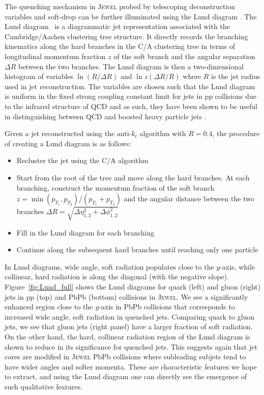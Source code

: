 \documentclass[notoc,preprintnumbers]{JHEP3}
\begin{document}
The quenching mechanism in \textsc{Jewel} probed by telescoping deconstruction variables and soft-drop can be further illuminated using the Lund diagram \cite{Andersson1989}. The Lund diagram~\cite{Andersson1989} is a diagrammatic jet representation associated with the Cambridge/Aachen clustering tree structure. It directly records the branching kinematics along the hard branches in the C/A clustering tree in terms of longitudinal momentum fraction $z$ of the soft branch and the angular separation $\Delta R$ between the two branches. The Lund diagram is then a two-dimensional histogram of variables $\ln (R/\Delta R)$ and $\ln z(\Delta R/R)$ where $R$ is the jet radius used in jet reconstruction. The variables are chosen such that the Lund diagram is uniform in the fixed strong coupling constant limit for jets in pp collisions due to the infrared structure of QCD and as such, they have been shown to be useful in distinguishing between QCD and boosted heavy particle jets \cite{Salam:2016yht}.

Given a jet reconstructed using the anti-$k_{t}$ algorithm with $R = 0.4$, the procedure of creating a Lund diagram is as follows:
\begin{itemize}
	\item Recluster the jet using the C/A algorithm
	\item Start from the root of the tree and move along the hard branches. At each branching, construct the momentum fraction of the soft branch $z=\min(p_{T_1},p_{T_2})/(p_{T_1}+p_{T_2})$ and the angular distance between the two branches $\Delta R = \sqrt{\Delta \eta^2_{1, 2}+\Delta \phi^2_{1, 2}}$
	\item Fill in the Lund diagram for each branching
	\item Continue along the subsequent hard branches until reaching only one particle
\end{itemize}

In Lund diagrams, wide angle, soft radiation populates close to the $y$-axis, while collinear, hard radiation is along the diagonal (with the negative slope). Figure~\ref{fig:Lund_full} shows the Lund diagrams for quark (left) and gluon (right) jets in pp (top) and PbPb (bottom) collisions in \textsc{Jewel}. We see a significantly enhanced region close to the $y$-axis in PbPb collisions that corresponds to increased wide angle, soft radiation in quenched jets. Comparing quark to gluon jets, we see that gluon jets (right panel) have a larger fraction of soft radiation. On the other hand, the hard, collinear radiation region of the Lund diagram is shown to reduce in its significance for quenched jets. This suggests again that jet cores are modified in \textsc{Jewel} PbPb collisions where subleading subjets tend to have wider angles and softer momenta. These are characteristic features we hope to extract, and using the Lund diagram one can directly see the emergence of such qualitative features.
\end{document}
